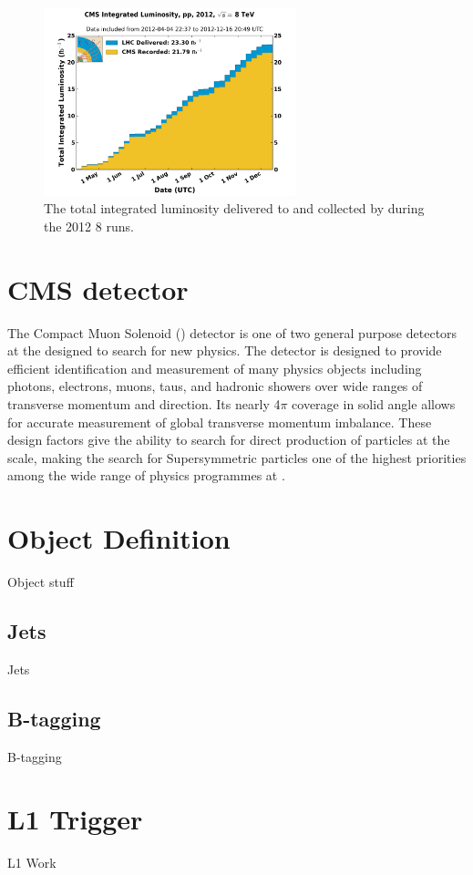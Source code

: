 \begin{figure}[!h]

\centering
\includegraphics[width=0.65\textwidth]{plots/lhc-lumo-8tev.png}
\caption[The total integrated luminosity delivered to and collected by \CMS during the 2012 8 \TeV \pp runs]{The total integrated luminosity delivered to and collected by \CMS during the 2012 8 \TeV \pp runs.}  
\label{fig:lhc-ring}
\end{figure}


\section{CMS detector}
\label{sec:cmsdetector}

The Compact Muon Solenoid (\CMS) detector is one of two general purpose detectors at the \LHC designed to search for new physics. The detector is designed to provide efficient identification and measurement of many physics objects including photons, electrons, muons, taus, and hadronic showers over wide ranges of transverse momentum and direction. Its nearly 4$\pi$ coverage in solid angle allows for accurate measurement of global transverse momentum imbalance. These design factors give \CMS the ability to search for direct production of \SUSY particles at the \TeV scale, making the search for Supersymmetric particles one of the highest priorities among the wide range of physics programmes at \CMS.


\section{Object Definition}
\label{sec:cmsobjects}

Object stuff

\subsection{Jets}
\label{subsec:cmsobjects-jets}

Jets

\subsection{B-tagging}
\label{subsec:cmsobjects-btagging}

B-tagging

\section{L1 Trigger}
\label{sec:l1trigger}


L1 Work
